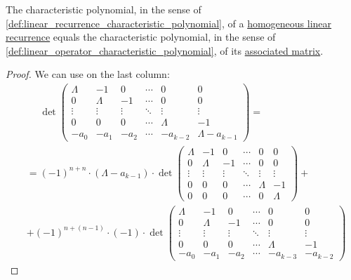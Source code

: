 \begin{proposition}\label{thm:linear_recurrence_characteristic_polynomial_via_matrix}
  The characteristic polynomial, in the sense of \cref{def:linear_recurrence_characteristic_polynomial}, of a \hyperref[def:homogeneous_linear_recurrence]{homogeneous linear recurrence} equals the characteristic polynomial, in the sense of \cref{def:linear_operator_characteristic_polynomial}, of its \hyperref[def:homogeneous_linear_recurrence_matrix]{associated matrix}.
\end{proposition}
\begin{proof}
  We can use  on the last column:
  \begin{align*}
    &\phantom{{}={}}
    \det \begin{pmatrix}
      \Lambda & -1      & 0       & \cdots & 0        & 0      \\
      0       & \Lambda & -1      & \cdots & 0        & 0      \\
      \vdots  & \vdots  & \vdots  & \ddots & \vdots   & \vdots \\
      0       & 0       & 0       & \cdots & \Lambda  & -1     \\
      -a_0    & -a_1    & -a_2    & \cdots & -a_{k-2} & \Lambda - a_{k-1}
    \end{pmatrix}
    = \\ &=
    (-1)^{n+n} \cdot (\Lambda - a_{k-1}) \cdot
    \det \begin{pmatrix}
      \Lambda & -1      & 0       & \cdots & 0       & 0      \\
      0       & \Lambda & -1      & \cdots & 0       & 0      \\
      \vdots  & \vdots  & \vdots  & \ddots & \vdots  & \vdots \\
      0       & 0       & 0       & \cdots & \Lambda & -1     \\
      0       & 0       & 0       & \cdots & 0       & \Lambda
    \end{pmatrix}
    + \\ &+
    (-1)^{n+(n-1)} \cdot (-1) \cdot
    \det \begin{pmatrix}
      \Lambda & -1      & 0       & \cdots & 0        & 0      \\
      0       & \Lambda & -1      & \cdots & 0        & 0      \\
      \vdots  & \vdots  & \vdots  & \ddots & \vdots   & \vdots \\
      0       & 0       & 0       & \cdots & \Lambda  & -1     \\
      -a_0    & -a_1    & -a_2    & \cdots & -a_{k-3} & -a_{k-2}
    \end{pmatrix}
  \end{align*}


\end{proof}
